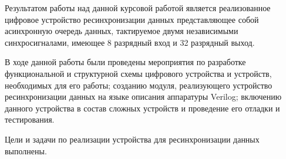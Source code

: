 \pril %

Результатом работы над данной курсовой работой является реализованное цифровое устройство ресинхронизации данных представляющее собой асинхронную очередь данных, тактируемое двумя независимыми синхросигналами, имеющее 8 разрядный вход и 32 разрядный выход.

В ходе данной работы были проведены мероприятия по разработке функциональной и структурной схемы цифрового устройства и устройств, необходимых для его работы; созданию модуля, реализующего устройство ресинхронизации данных на языке описания аппаратуры Verilog; включению данного устройства в состав сложных устройств и проведение его отладки и тестирования.

Цели и задачи по реализации устройства для ресинхронизации данных выполнены. 

